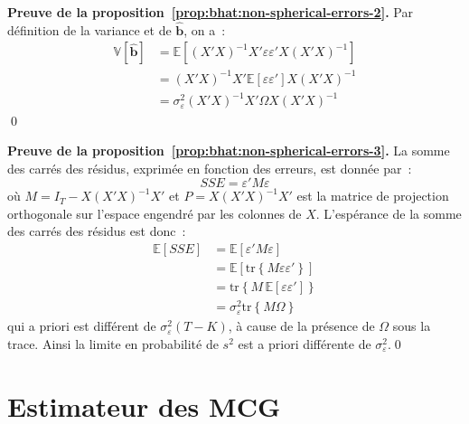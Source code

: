 \documentclass[10pt,a4paper]{article}
\newcommand{\tracarg}[1]{\mathrm{tr}\left\{#1\right\}}
\theoremstyle{definition}
\begin{document}
\begin{notes}

  \textbf{Preuve de la proposition~\ref{prop:bhat:non-spherical-errors-2}.} Par définition de la variance et de $\hat{\mathbf b}$, on a~:
  \[
    \begin{split}
      \mathbb V\left[\hat{\mathbf b}\right] &= \mathbb E \left[(X'X)^{-1}X'\varepsilon\varepsilon' X (X'X)^{-1} \right]\\
                                             &= (X'X)^{-1}X'\mathbb E[\varepsilon\varepsilon']X(X'X)^{-1}\\
      &= \sigma_{\varepsilon}^2(X'X)^{-1}X'\Omega X (X'X)^{-1}
    \end{split}
  \]
  \qed

  \bigskip

  \textbf{Preuve de la proposition~\ref{prop:bhat:non-spherical-errors-3}.} La somme des carrés des résidus, exprimée en fonction des erreurs, est donnée par~:
  \[
    SSE = \varepsilon' M \varepsilon
  \]
  où $M= I_T - X (X'X)^{-1}X'$ et $P = X(X'X)^{-1}X'$ est la matrice
  de projection orthogonale sur l'espace engendré par les colonnes
  de $X$. L'espérance de la somme des carrés des résidus est donc~:
  \[
    \begin{split}
      \mathbb E[SSE] &= \mathbb E \left[\varepsilon' M \varepsilon \right]\\
                     &= \mathbb E \left[\tracarg{M\varepsilon\varepsilon'}\right]\\
                     &= \tracarg{M \,\mathbb E [\varepsilon\varepsilon']}\\
                     &= \sigma_{\varepsilon}^{2}\tracarg{M\Omega}
    \end{split}
  \]
  qui a priori est différent de $\sigma_{\varepsilon}^2(T-K)$, à cause de la présence de $\Omega$ sous la trace. Ainsi la limite en probabilité de $s^2$ est a priori différente de $\sigma_{\varepsilon}^2$.\qed

\end{notes}


\section{Estimateur des MCG}
\end{document}
